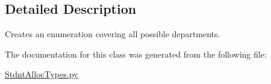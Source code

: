 \subsection{Detailed Description}
Creates an enumeration covering all possible departments. 

The documentation for this class was generated from the following file\+:\begin{DoxyCompactItemize}
\item 
\mbox{\hyperlink{_stdnt_alloc_types_8py}{Stdnt\+Alloc\+Types.\+py}}\end{DoxyCompactItemize}

